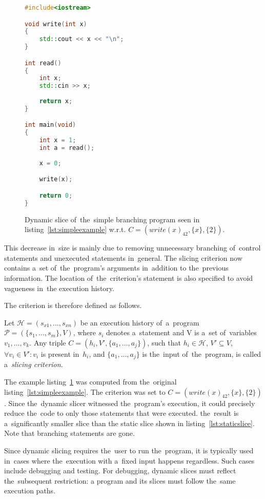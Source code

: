 \begin{figure}[ht]\centering
\begin{lstlisting}[language=C++]
#include<iostream>

void write(int x)
{
	std::cout << x << "\n";
}

int read()
{
	int x;
	std::cin >> x;
	
	return x;
}

int main(void)
{
	int x = 1;
	int a = read();
		
	x = 0;

	write(x);

	return 0;
}  
\end{lstlisting}
\caption{Dynamic slice of~the~simple branching program seen
in listing~\ref{lst:simpleexample} w.r.t. 
$C = (write(x)_{42}, \{x\}, \{2\})$.}
\label{lst:dynamicslice}
\end{figure}

This decrease in~size is mainly due to removing unnecessary 
branching of~control statements and unexecuted statements in~general. 
The slicing criterion now contains a~set of~the~program's 
arguments in~addition to the~previous information. 
The location of~the~criterion's statement is also specified to avoid 
vagueness in~the execution history. 

The criterion is therefore defined as follows.

\begin{defn}\label{def02:6}
  Let $\mathcal{H} = (s_{x1},\dots,s_{xn})$ be an execution history of~a~program 
  $\mathcal{P} = (\{s_1,\dots,s_m\}, V)$, where $s_i$ denotes a~statement
  and V is a~set of~variables $v_1,\dots,v_k$.
  Any triple $C = (h_i, V', \{a_1,\dots,a_j\})$, such that $h_i \in \mathcal{H}$,
  $V' \subseteq V$, $\forall v_i \in V': v_i$ is present in~$h_i$,
  and $\{a_1,\dots,a_j\}$ is the~input of~the~program,
  is called a~\emph{slicing criterion}.
\end{defn}

The example listing~\ref{lst:dynamicslice} was computed from the~original
listing~\ref{lst:simpleexample}. 
The criterion was set to $C = (write(x)_{42}, \{x\}, \{2\})$.
Since the~dynamic slicer witnessed the~program's execution,
it could precisely reduce the~code to only those statements
that were executed. the~result is a~significantly smaller slice
than the static slice shown in listing~\ref{lst:staticslice}.
Note that branching statements are gone.

Since dynamic slicing requires the~user to run the~program, 
it is typically used in~cases where the~execution with a~fixed 
input happens regardless. Such cases include debugging and testing. 
For debugging, dynamic slices must reflect the~subsequent restriction: 
a program and its slices must follow the~same execution paths.

